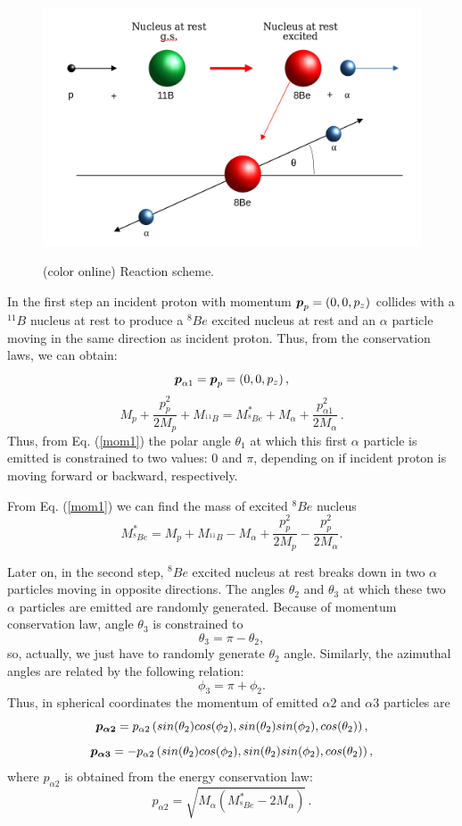 \documentclass[aps,prc,twocolumn,floatfix,showpacs,a4paper,
nofootinbib,amsmath,amssymb]{revtex4}
\newcommand{\be}{\begin{equation}}
\newcommand{\ee}{\end{equation}}
\renewcommand{\vec}[1]{\mbox{\boldmath$#1$}}
\begin{document}
\begin{figure}[h]
	\begin{center}
		\resizebox{0.98\columnwidth}{!}
		{\includegraphics{reaction_scheme.png}}
		\caption{ (color online)
			Reaction scheme.
		}
		\label{Reaction}
	\end{center}
\end{figure} 

In the first step an incident proton with momentum $\vec p_p=(0,0,p_z)$ collides with a $ ^{11}B$ nucleus at rest to produce a $^8Be$ excited nucleus at rest and an $\alpha$ particle moving in the same direction as incident proton. Thus, from the conservation laws, we can obtain: 
\begin{equation}
	\vec p_{\alpha1} = \vec p_p=(0,0,p_z)\,,
	\label{mom1}
\end{equation}
\be
M_p + \frac{p_p^2}{2M_p} + M_{^{11}B} = M_{^8Be}^* + M_{\alpha} + \frac{p_{\alpha1}^2}{2M_{\alpha}}\,.
	\label{ener1}
\ee 
Thus, from Eq. (\ref{mom1}) the polar angle $\theta_1$ at which this first $\alpha$ particle is emitted is constrained to two values: $0$ and $\pi$, depending on if incident proton is moving forward or backward, respectively.

From Eq. (\ref{mom1}) we can find the mass of excited $^8Be$ nucleus
\be
M_{^8Be}^* = M_p + M_{^{11}B} -  M_{\alpha} + \frac{p_p^2}{2M_p}  -  \frac{p_p^2}{2M_{\alpha}}.
\label{ex.mass}
\ee

Later on, in the second step,  $^8Be$ excited nucleus at rest breaks down in two $\alpha$ particles moving in opposite directions. The angles $\theta_2$ and $\theta_3$ at which these two $\alpha$ particles are emitted are randomly generated. Because of momentum conservation law, angle $\theta_3$ is constrained to
\be
\theta_3 = \pi - \theta_2,
\ee
so, actually, we just have to randomly generate $\theta_2$ angle. Similarly, the azimuthal angles are related by the following relation:
\be
\phi_3 = \pi + \phi_2.
\ee
Thus, in spherical coordinates the momentum of emitted $\alpha 2$ and $\alpha 3$ particles are 
\be
\vec{p_{\alpha2}} = p_{\alpha2}\left(sin(\theta_2)cos(\phi_2),sin(\theta_2)sin(\phi_2),cos(\theta_2)\right),
\ee
\be
\vec{p_{\alpha3}} = -p_{\alpha2}\left(sin(\theta_2)cos(\phi_2),sin(\theta_2)sin(\phi_2),cos(\theta_2)\right),
\ee
where $p_{\alpha 2}$ is obtained from the energy conservation law:
\be
p_{\alpha 2}=\sqrt{M_\alpha (M_{^8Be}^* - 2 M_\alpha)}\,.
\label{alpha_for_decay}
\ee
\end{document}
